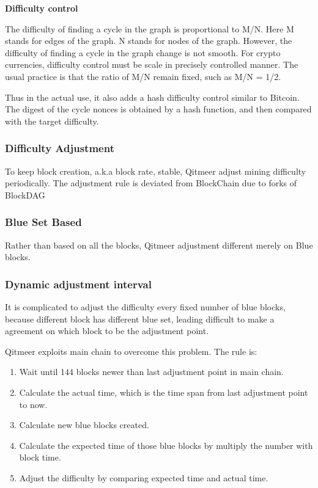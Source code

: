 \documentclass[a4paper,11pt]{article}
\begin{document}
\textbf{Difficulty control}

The difficulty of finding a cycle in the graph is proportional to M/N. Here M stands for edges of the graph.
N stands for nodes of the graph. However, the difficulty of finding a cycle in the graph change is not smooth.
For crypto currencies, difficulty control must be scale in precisely controlled manner. The usual practice is
that the ratio of M/N remain fixed, such as M/N = 1/2.

Thus in the actual use, it also adds a hash difficulty control similar to Bitcoin. The digest of the cycle nonces is obtained by a hash function,
and then compared with the target difficulty.

\subsubsection{Difficulty Adjustment}
To keep block creation, a.k.a block rate, stable, Qitmeer adjust mining difficulty periodically. 
The adjustment rule is deviated from BlockChain due to forks of BlockDAG

\subsubsection*{Blue Set Based}
Rather than based on all the blocks, Qitmeer adjustment different merely on Blue blocks. 

\subsubsection*{Dynamic adjustment interval}
It is complicated to adjust the difficulty every fixed number of blue blocks, because different block has different blue set, leading difficult to make a agreement on which block to be the adjustment point.

Qitmeer exploits main chain to overcome this problem. The rule is:

\begin{enumerate}
	\item  Wait until 144 blocks newer than last adjustment point in main chain.
    \item  Calculate the actual time, which is the time span from last adjustment point to now.
    \item  Calculate new blue blocks created.
    \item  Calculate the expected time of those blue blocks by multiply the number with block time.
    \item  Adjust the difficulty by comparing expected time and actual time.
\end{enumerate}
\end{document}
